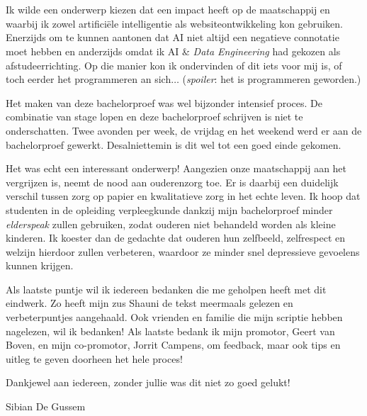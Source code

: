 
\chapter*{}
\label{ch:voorwoord}


Ik wilde een onderwerp kiezen dat een impact heeft op de maatschappij en waarbij ik zowel artificiële intelligentie als websiteontwikkeling kon gebruiken. Enerzijds om te kunnen aantonen dat AI niet altijd een negatieve connotatie moet hebben en anderzijds omdat ik AI \& \textit{Data Engineering} had gekozen als afstudeerrichting. Op die manier kon ik ondervinden of dit iets voor mij is, of toch eerder het programmeren an sich$\ldots$ (\textit{spoiler}: het is programmeren geworden.)

Het maken van deze bachelorproef was wel bijzonder intensief proces. De combinatie van stage lopen en deze bachelorproef schrijven is niet te onderschatten. Twee avonden per week, de vrijdag en het weekend werd er aan de bachelorproef gewerkt. Desalniettemin is dit wel tot een goed einde gekomen.

Het was echt een interessant onderwerp! Aangezien onze maatschappij aan het vergrijzen is, neemt de nood aan ouderenzorg toe. Er is daarbij een duidelijk verschil tussen zorg op papier en kwalitatieve zorg in het echte leven. Ik hoop dat studenten in de opleiding verpleegkunde dankzij mijn bachelorproef minder \textit{elderspeak} zullen gebruiken, zodat ouderen niet behandeld worden als kleine kinderen. Ik koester dan de gedachte dat ouderen hun zelfbeeld, zelfrespect en welzijn hierdoor zullen verbeteren, waardoor ze minder snel depressieve gevoelens kunnen krijgen.

Als laatste puntje wil ik iedereen bedanken die me geholpen heeft met dit eindwerk. Zo heeft mijn zus Shauni de tekst meermaals gelezen en verbeterpuntjes aangehaald. Ook vrienden en familie die mijn scriptie hebben nagelezen, wil ik bedanken!
Als laatste bedank ik mijn promotor, Geert van Boven, en mijn co-promotor, Jorrit Campens, om feedback, maar ook tips en uitleg te geven doorheen het hele proces!

Dankjewel aan iedereen, zonder jullie was dit niet zo goed gelukt!

Sibian De Gussem